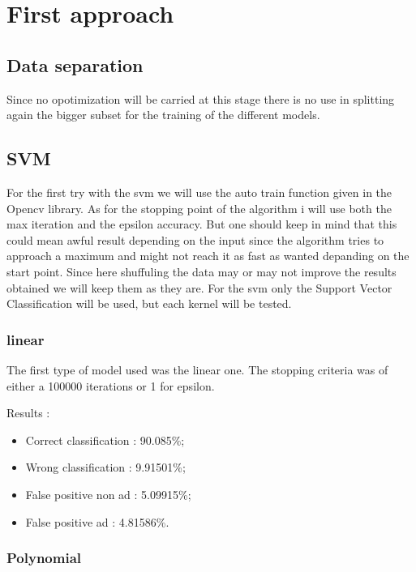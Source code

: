\chapter{First approach}

\section{Data separation}

Since no opotimization will be carried at this stage there is no use in splitting again the bigger subset for the training of the different models.

\section{SVM}

For the first try with the svm we will use the auto train function given in the Opencv library. As for the stopping point of the algorithm i will use both the max iteration and the epsilon accuracy. But one should keep in mind that this could mean awful result depending on the input since the algorithm tries to approach a maximum and might not reach it as fast as wanted depanding on the start point. Since here shuffuling the data may or may not improve the results obtained we will keep them as they are.
For the svm only the Support Vector Classification will be used, but each kernel will be tested.

\subsection{linear}

The first type of model used was the linear one. The stopping criteria was of either a 100000 iterations or 1 for epsilon.

Results :
\begin{itemize}
  \item Correct classification : 90.085\%;
  \item Wrong classification : 9.91501\%;
  \item False positive non ad : 5.09915\%;
  \item False positive ad : 4.81586\%.
\end{itemize}


\subsection{Polynomial}

